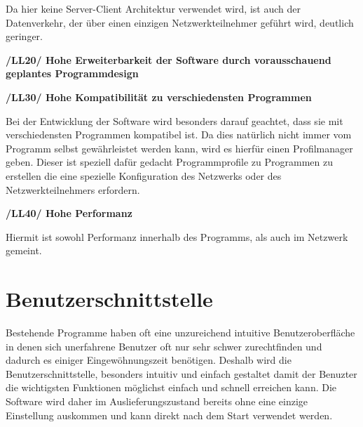 \documentclass[a4paper,12pt]{scrreprt}
\begin{document}
	Da hier keine Server-Client Architektur verwendet wird, ist auch der Datenverkehr, der über einen einzigen Netzwerkteilnehmer geführt wird, deutlich geringer.
	
\textbf{/LL20/ Hohe Erweiterbarkeit der Software durch vorausschauend geplantes Programmdesign}
	
\textbf{/LL30/ Hohe Kompatibilität zu verschiedensten Programmen}
	
	Bei der Entwicklung der Software wird besonders darauf geachtet, dass sie mit verschiedensten Programmen kompatibel ist. Da dies natürlich nicht immer vom Programm selbst gewährleistet werden kann, wird es hierfür einen Profilmanager geben. Dieser ist speziell dafür gedacht Programmprofile zu Programmen zu erstellen die eine spezielle Konfiguration des Netzwerks oder des Netzwerkteilnehmers erfordern.
	
\textbf{/LL40/ Hohe Performanz}
	
	Hiermit ist sowohl Performanz innerhalb des Programms, als auch im Netzwerk gemeint.
	
	
	
	
\chapter{Benutzerschnittstelle}
	Bestehende Programme haben oft eine unzureichend intuitive Benutzeroberfläche in denen sich unerfahrene Benutzer oft nur sehr schwer zurechtfinden und dadurch es einiger Eingewöhnungszeit benötigen. Deshalb wird die Benutzerschnittstelle, besonders intuitiv und einfach gestaltet damit der Benuzter die wichtigsten Funktionen möglichst einfach und schnell erreichen kann. Die Software wird daher im Auslieferungszustand bereits ohne eine einzige Einstellung auskommen und kann direkt nach dem Start verwendet werden.
	
	
\end{document}
